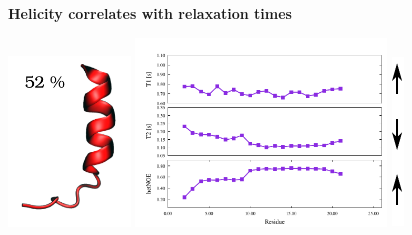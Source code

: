 \begin{frame}
\LARGE{\centering
\textbf{Helicity correlates with relaxation times} \\
}
\begin{center}
 \includegraphics[height=4.5cm]{plots/helix1.pdf}
 \includegraphics[height=5cm]{plots/simul_helix11.pdf}
 \includegraphics[height=4.5cm]{plots/arrows.pdf}
\end{center}
\end{frame}

